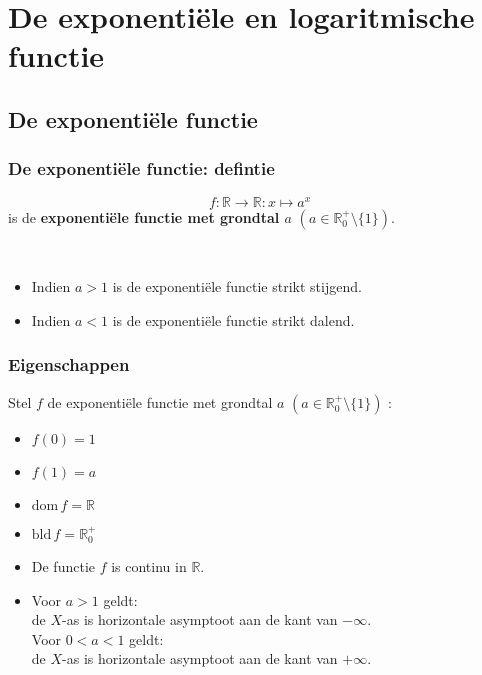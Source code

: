 \section{De exponenti\"ele en logaritmische functie}
\frame{\tableofcontents[currentsection]}

\subsection{De exponenti\"ele functie}
\begin{frame}
\frametitle{De exponenti\"ele functie: defintie} 
\pause
\begin{definitie}
\[f:\mathbb{R} \rightarrow \mathbb{R}:x\mapsto a^x\] 
is de {\bf exponenti\"ele functie met grondtal $a$} $(a\in \mathbb{R}_0^+\setminus \{1\})$.
\end{definitie}
~\\
\pause
\begin{itemize}
\item<+-> Indien $a>1$ is de exponenti\"ele functie strikt stijgend. 
\item<+-> Indien $a<1$ is de exponenti\"ele functie strikt dalend. 
\end{itemize}
\end{frame}

\begin{frame}
\frametitle{Eigenschappen}
\pause
\begin{eigenschap}
Stel $f$ de exponenti\"ele functie met grondtal $a$ $(a\in\mathbb{R}_0^{+}\setminus \{1\})$ :
\pause
\begin{itemize}
\item<+-> $f(0)=1$ 
\item<+-> $f(1)=a$ 
\item<+-> $\mbox{dom}\, f=\mathbb{R}$
\item<+-> $\mbox{bld}\, f=\mathbb{R}_0^+$
\item<+-> De functie $f$ is continu in $\mathbb{R}$.
\item<+-> \pause
      Voor $a>1$ geldt:\\
                 de $X$-as is horizontale asymptoot aan de kant van $-\infty$.\\
          \pause
      Voor $0<a<1$ geldt:\\
                de $X$-as is horizontale asymptoot aan de kant van $+\infty$.
\end{itemize}   
\end{eigenschap}
\end{frame}

